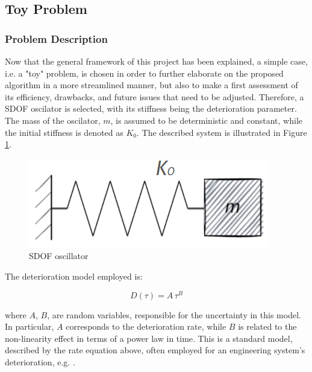 
\subsection{Toy Problem}


\subsubsection{Problem Description} \label{toyDescSec}

Now that the general framework of this project has been explained, a simple case, i.e. a "toy" problem, is chosen in order to further elaborate on the proposed algorithm in a more streamlined manner, but also to make a first assessment of its efficiency, drawbacks, and future issues that need to be adjusted. Therefore, a \gls{SDOF} oscilator is selected, with its stiffness being the deterioration parameter. The mass of the oscilator, $m$, is assumed to be deterministic and constant, while the initial stiffness is denoted as $K_0$. The described system is illustrated in Figure \ref{sdofOscil}.

\begin{figure}[H]
    \centering
	\includegraphics[width=0.3\linewidth]{Figures/SDOFoscilator.png}
	\caption{\gls{SDOF} oscillator}
	\label{sdofOscil}
\end{figure}

The deterioration model employed is:

\begin{equation}
    D(\tau) = A \, \tau^B
\end{equation}

where $A$, $B$, are random variables, responsible for the uncertainty in this model. In particular, $A$ corresponds to the deterioration rate, while $B$ is related to the non-linearity effect in terms of a power law in time. This is a standard model, described by the rate equation above, often employed for an engineering system's deterioration, e.g. \cite{kamariotis2022value}.\\

